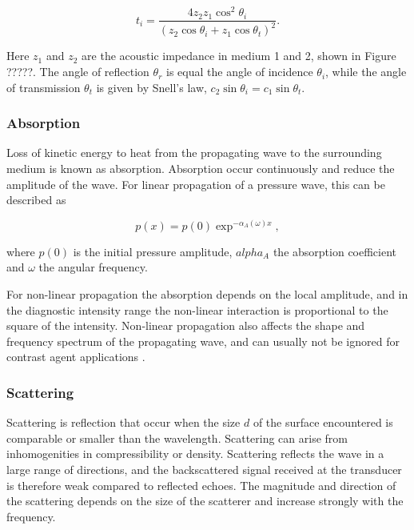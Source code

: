 \begin{equation}
\label{fresnel2}
t_i = \frac{4z_2 z_1 \cos^2 \theta_i}{(z_2 \cos \theta_i + z_1 \cos \theta_t)^2}.
\end{equation}

Here $z_1$ and $z_2$ are the acoustic impedance in medium 1 and 2, shown in Figure ?????. The angle of reflection $\theta_r$ is equal the angle of incidence $\theta_i$, while the angle of transmission $\theta_t$ is given by Snell's law\cite{blackstock2000fundamentals}, $ c_2 \sin \theta_i = c_1 \sin \theta_t$. 

\subsubsection{Absorption}
Loss of kinetic energy to heat from the propagating wave to the surrounding medium is known as absorption. Absorption occur continuously and reduce the amplitude of the wave. For linear propagation of a pressure wave, this can be described as 

\begin{equation}
p(x) = p(0)\exp^{-\alpha_A(\omega)x},
\end{equation} 

where $p(0)$ is the initial pressure amplitude, $alpha_A$ the absorption coefficient and $\omega$ the angular frequency.

For non-linear propagation the absorption depends on the local amplitude, and in the diagnostic intensity range the non-linear interaction is proportional to the square of the intensity\cite{:/content/asa/journal/jasa/97/3/10.1121/1.412091}. Non-linear propagation also affects the shape and frequency spectrum of the propagating wave, and can usually not be ignored for contrast agent applications \cite{Healey2012}. 

 
\subsubsection{Scattering}
Scattering is reflection that occur when the size $d$ of the surface encountered is comparable or smaller than the wavelength. Scattering can arise from inhomogenities in compressibility or density. Scattering reflects the wave in a large range of directions, and the backscattered signal received at the transducer is therefore weak compared to reflected echoes. The magnitude and direction of the scattering depends on the size of the scatterer and increase strongly with the frequency.  

